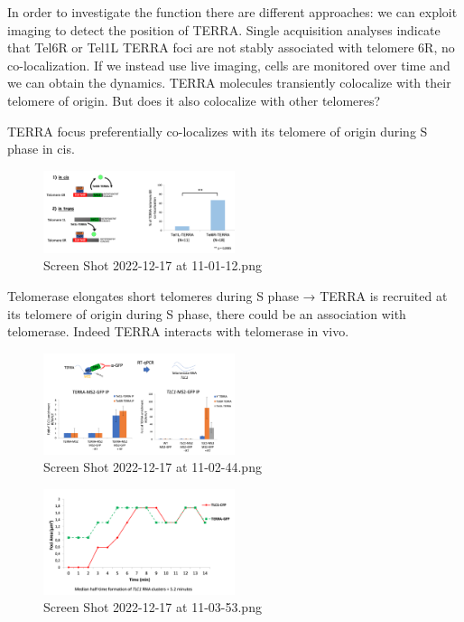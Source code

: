 In order to investigate the function there are different approaches: we
can exploit imaging to detect the position of TERRA. Single acquisition
analyses indicate that Tel6R or Tel1L TERRA foci are not stably
associated with telomere 6R, no co-localization. If we instead use live
imaging, cells are monitored over time and we can obtain the dynamics.
TERRA molecules transiently colocalize with their telomere of origin.
But does it also colocalize with other telomeres?

TERRA focus preferentially co-localizes with its telomere of origin
during S phase in cis.

\begin{figure}
\centering
\includegraphics[width=0.5\textwidth]{../_resources/Screen_Shot_2022-12-17_at_11-01-12.png}
\caption{Screen Shot 2022-12-17 at 11-01-12.png}
\end{figure}

Telomerase elongates short telomeres during S phase → TERRA is recruited
at its telomere of origin during S phase, there could be an association
with telomerase. Indeed TERRA interacts with telomerase in vivo.

\begin{figure}
\centering
\includegraphics[width=0.5\textwidth]{../_resources/Screen_Shot_2022-12-17_at_11-02-44.png}
\caption{Screen Shot 2022-12-17 at 11-02-44.png}
\end{figure}

\begin{figure}
\centering
\includegraphics[width=0.5\textwidth]{../_resources/Screen_Shot_2022-12-17_at_11-03-53.png}
\caption{Screen Shot 2022-12-17 at 11-03-53.png}
\end{figure}

